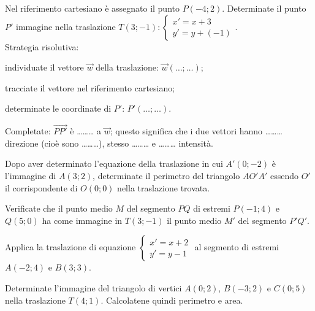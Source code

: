 \begin{esercizio}
  \label{ese:8.48} %
  Nel riferimento cartesiano è assegnato il punto $P(-4;2)$. 
  Determinate il punto $P'$ immagine nella traslazione 
  $T(3;-1):\begin{cases}x'=x+3\\y'=y+(-1)\end{cases}$.\\
  Strategia risolutiva:
  \begin{enumerate*}
    \item individuate il vettore $\vec{w}$ della traslazione: 
    $\vec{w}(\ldots{};\ldots{})$;
    \item tracciate il vettore nel riferimento cartesiano;
    \item determinate le coordinate di $P'$: $P'(\ldots{};\ldots{})$.
  \end{enumerate*}
  Completate: $\overrightarrow{PP'}$ è \ldots\ldots\ldots{} a 
  $\vec{w}$; questo significa che i due vettori hanno 
  \ldots\ldots\ldots{} direzione (cioè sono \ldots\ldots\ldots{}), 
  stesso \ldots\ldots\ldots{} e \ldots\ldots\ldots{} intensità.
\end{esercizio}


\begin{esercizio}
  \label{ese:8.51} %
  Dopo aver determinato l'equazione della traslazione in cui $A'(0;-2)$ 
  è l'immagine di $A(3;2)$, determinate il perimetro del triangolo 
  $AO'A'$ essendo $O'$ il corrispondente di $O(0;0)$ nella traslazione 
  trovata.
\end{esercizio}

\begin{esercizio}
  \label{ese:8.52} %
  Verificate che il punto medio $M$ del segmento $PQ$ di estremi 
  $P(-1;4)$ e $Q(5;0)$ ha come immagine in $T(3;-1)$ il punto medio 
  $M'$ del segmento $P'Q'$.
\end{esercizio}

\begin{esercizio}
  \label{ese:8.53} %
  Applica la traslazione di equazione 
  $\begin{cases}x'=x+2\\y'=y-1\end{cases}$ al segmento di estremi 
  $A(-2;4)$ e $B(3;3)$. 
\end{esercizio}

\begin{esercizio}
  \label{ese:8.55} %
  Determinate l'immagine del triangolo di vertici $A(0;2)$, $B(-3;2)$ e 
  $C(0;5)$ nella traslazione $T(4;1)$. Calcolatene quindi perimetro e 
  area.
\end{esercizio}

